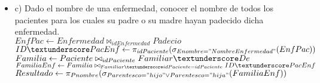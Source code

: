 \documentclass{article}
\begin{document}
\begin{itemize}
\begin{itemize}
        \item c) Dado el nombre de una enfermedad, conocer el nombre de todos los pacientes para los cuales su padre o su madre hayan padecido dicha enfermedad. \\
        $EnfPac \leftarrow Enfermedad \bowtie_{idEnfermedad} Padecio$ \\
        $ID\textunderscore PacEnf \leftarrow \pi_{idPaciente}(\sigma_{Enombre = "NombreEnfermedad"}(EnfPac))$ \\
        $Familia \leftarrow Paciente \bowtie_{idPaciente} Familiar\textunderscore De$ \\
        $FamiliaEnf \leftarrow Familia \bowtie_{Familiar\textunderscore idPaciente = idPaciente} ID\textunderscore PacEnf$ \\
        $Resultado \leftarrow \pi_{Pnombre} (\sigma_{Parentesco = "hijo" \vee Parentesco = "hija"} (FamiliaEnf))$ \\
        
    \end{itemize}
\end{itemize}
\end{document}
